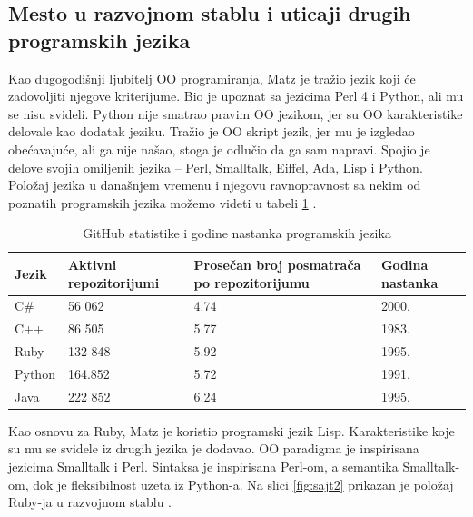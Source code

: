\documentclass[a4paper]{article}
\begin{document}
\subsection{Mesto u razvojnom stablu i uticaji drugih programskih jezika}

Kao dugogodišnji ljubitelj OO programiranja, Matz je tražio jezik koji će zadovoljiti njegove kriterijume. Bio je upoznat sa jezicima Perl 4 i Python, ali mu se nisu svideli. Python nije smatrao pravim OO jezikom, jer su OO karakteristike delovale kao dodatak jeziku. Tražio je OO skript jezik, jer mu je izgledao obećavajuće, ali ga nije našao, stoga je odlučio da ga sam napravi. Spojio je delove svojih omiljenih jezika – Perl, Smalltalk, Eiffel, Ada, Lisp i Python. Položaj jezika u današnjem vremenu i njegovu ravnopravnost sa nekim od poznatih programskih jezika možemo videti u tabeli \ref{tab:tabela1} \cite{rubyProgLang}.

\begin{table}[h!]
\begin{center}
\caption{GitHub statistike i godine nastanka programskih jezika}\vspace*{15pt}
\begin{tabular}{|p{1cm}|p{2cm}|p{4cm}|p{2cm}|} \hline
Jezik&Aktivni repozitorijumi&Prosečan broj posmatrača po repozitorijumu& Godina nastanka\\ \hline
C\#&56 062 &4.74&2000.\\ \hline
C++&86 505 &5.77&1983.\\ \hline
Ruby&132 848 &5.92&1995.\\ \hline
Python&164.852 &5.72&1991.\\ \hline
Java&222 852 &6.24&1995.\\ \hline
\end{tabular}
\label{tab:tabela1}
\end{center}
\end{table}
Kao osnovu za Ruby, Matz je koristio programski jezik Lisp. Karakteristike koje su mu se svidele iz drugih jezika je dodavao. OO paradigma je inspirisana jezicima Smalltalk i Perl. Sintaksa je inspirisana Perl-om, a semantika Smalltalk-om, dok je fleksibilnost uzeta iz Python-a. Na slici \ref{fig:sajt2} prikazan je položaj Ruby-ja u razvojnom stablu \cite{rubyTalk}\cite{ruby-doc}.
\end{document}

